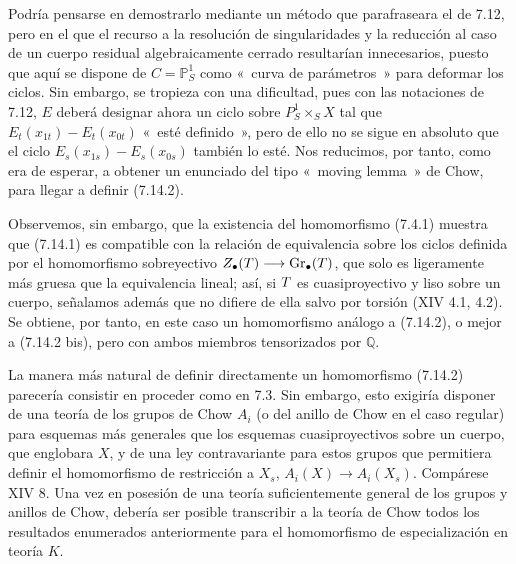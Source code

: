 Podría pensarse en demostrarlo mediante un método que parafraseara el de 7.12, pero en el que el recurso a la resolución de singularidades y la reducción al caso de un cuerpo residual algebraicamente cerrado resultarían innecesarios, puesto que aquí se dispone de \(C=\mathbb P^1_S\) como «~curva de parámetros~» para deformar los ciclos. Sin embargo, se tropieza con una dificultad, pues con las notaciones de 7.12, \(E\) deberá designar ahora un ciclo sobre \(P^1_S\times_SX\) tal que \(E_t(x_{1t})-E_t(x_{0t})\) «~esté definido~», pero de ello no se sigue en absoluto que el ciclo \(E_s(x_{1s})-E_s(x_{0s})\) también lo esté. Nos reducimos, por tanto, como era de esperar, a obtener un enunciado del tipo «~moving lemma~» de Chow, para llegar a definir (7.14.2).

Observemos, sin embargo, que la existencia del homomorfismo (7.4.1) muestra que (7.14.1) es compatible con la relación de equivalencia sobre los ciclos definida por el homomorfismo sobreyectivo \(Z_\bullet(T)\longrightarrow \Gr_\bullet(T)\), que solo es ligeramente más gruesa que la equivalencia lineal; así, si \(\sisi{Z}{T}\) es cuasiproyectivo y liso sobre un cuerpo, señalamos además que no difiere de ella salvo por torsión (XIV 4.1, 4.2). Se obtiene, por tanto, en este caso un homomorfismo análogo a (7.14.2), o mejor a (7.14.2 bis), pero con ambos miembros tensorizados por \(\mathbb Q\). %

La manera más natural de definir directamente un homomorfismo (7.14.2) parecería consistir en proceder como en 7.3. Sin embargo, esto exigiría disponer de una teoría de los grupos de Chow \(A_i\) (o del anillo de Chow en el caso regular) para esquemas más generales que los esquemas cuasiproyectivos sobre un cuerpo, que englobara \(X\), y de una ley contravariante para estos grupos que permitiera definir el homomorfismo de restricción a \(X_s\), \(A_i(X)\longrightarrow A_i(X_s)\). Compárese XIV 8. Una vez en posesión de una teoría suficientemente general de los grupos y anillos de Chow, debería ser posible transcribir a la teoría de Chow todos los resultados enumerados anteriormente para el homomorfismo de especialización en teoría \(K\).

